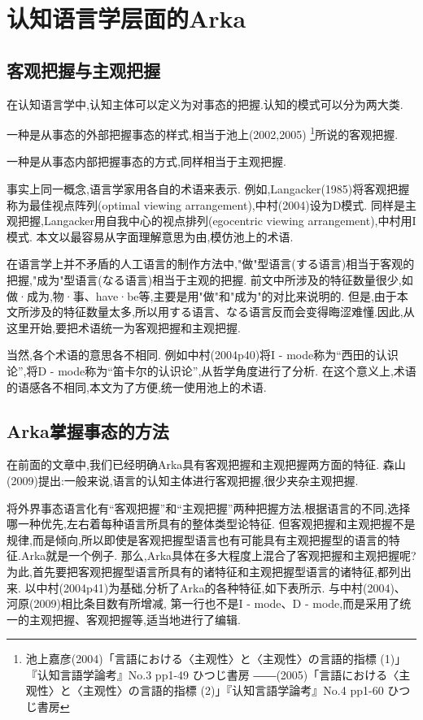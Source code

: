 \chapter[认知语言学层面的Arka]{认知语言学层面的Arka}

\section{客观把握与主观把握}
在认知语言学中,认知主体可以定义为对事态的把握.认知的模式可以分为两大类.

一种是从事态的外部把握事态的样式,相当于池上(2002,2005)
\footnote{池上嘉彦(2004)「言語における〈主观性〉と〈主观性〉の言語的指標 (1)」『认知言語学論考』No.3 pp1-49 ひつじ書房
――(2005)「言語における〈主观性〉と〈主观性〉の言語的指標 (2)」『认知言語学論考』No.4 pp1-60 ひつじ書房}所说的客观把握.

一种是从事态内部把握事态的方式,同样相当于主观把握.

事实上同一概念,语言学家用各自的术语来表示.
例如,Langacker(1985)将客观把握称为最佳视点阵列(optimal viewing arrangement),中村(2004)设为D模式.
同样是主观把握,Langacker用自我中心的视点排列(egocentric viewing arrangement),中村用I模式.
本文以最容易从字面理解意思为由,模仿池上的术语.

在语言学上并不矛盾的人工语言的制作方法中,"做"型语言(する语言)相当于客观的把握,"成为"型语言(なる语言)相当于主观的把握.
前文中所涉及的特征数量很少,如做·成为,物·事、have·be等,主要是用"做"和"成为"的对比来说明的.
但是,由于本文所涉及的特征数量太多,所以用する语言、なる语言反而会变得晦涩难懂.因此,从这里开始,要把术语统一为客观把握和主观把握.

当然,各个术语的意思各不相同.
例如中村(2004p40)将I - mode称为``西田的认识论'',将D - mode称为``笛卡尔的认识论'',从哲学角度进行了分析.
在这个意义上,术语的语感各不相同,本文为了方便,统一使用池上的术语.

\section{Arka掌握事态的方法}

在前面的文章中,我们已经明确Arka具有客观把握和主观把握两方面的特征.
森山(2009)提出:一般来说,语言的认知主体进行客观把握,很少夹杂主观把握.

将外界事态语言化有``客观把握''和``主观把握''两种把握方法,根据语言的不同,选择哪一种优先,左右着每种语言所具有的整体类型论特征.
但客观把握和主观把握不是规律,而是倾向,所以即使是客观把握型语言也有可能具有主观把握型的语言的特征.Arka就是一个例子.
那么,Arka具体在多大程度上混合了客观把握和主观把握呢?为此,首先要把客观把握型语言所具有的诸特征和主观把握型语言的诸特征,都列出来.
以中村(2004p41)为基础,分析了Arka的各种特征,如下表所示.
与中村(2004)、河原(2009)相比条目数有所增减,
第一行也不是I - mode、D - mode,而是采用了统一的主观把握、客观把握等,适当地进行了编辑.

